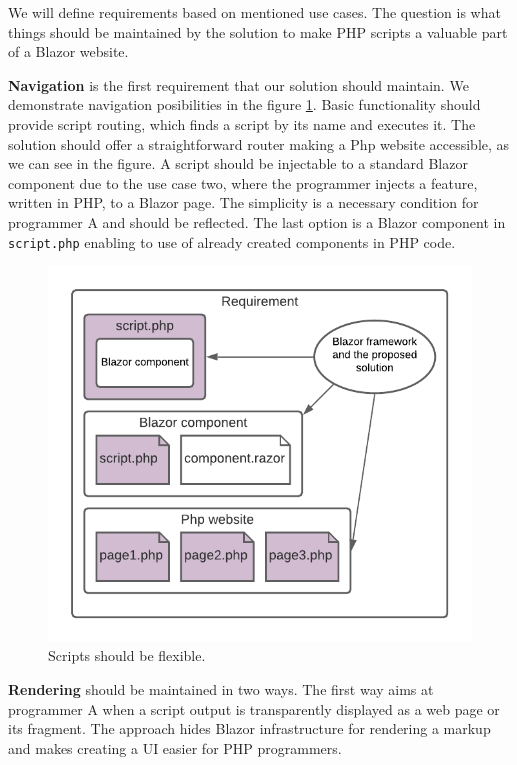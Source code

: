 We will define requirements based on mentioned use cases.
The question is what things should be maintained by the solution to make PHP scripts a valuable part of a Blazor website.
\par
\textbf{Navigation} is the first requirement that our solution should maintain.
We demonstrate navigation posibilities in the figure \ref{img10:scripts}.
Basic functionality should provide script routing, which finds a script by its name and executes it.
The solution should offer a straightforward router making a Php website accessible, as we can see in the figure.
A script should be injectable to a standard Blazor component due to the use case two, where the programmer injects a feature, written in PHP, to a Blazor page.
The simplicity is a necessary condition for programmer A and should be reflected.
The last option is a Blazor component in \texttt{script.php} enabling to use of already created components in PHP code.
\par
\begin{figure}[!b]\centering
\includegraphics{./img/Requirement}
\caption{Scripts should be flexible.}
\label{img10:scripts}
\end{figure} 
\par
\textbf{Rendering} should be maintained in two ways.
The first way aims at programmer A when a script output is transparently displayed as a web page or its fragment.
The approach hides Blazor infrastructure for rendering a markup and makes creating a UI easier for PHP programmers.
